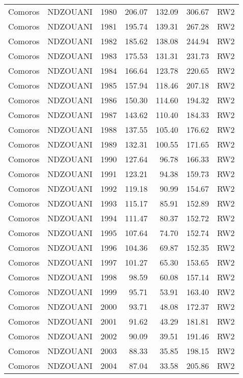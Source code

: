 \begin{longtable}{lllrrrl}
  Comoros & NDZOUANI & 1980 & 206.07 & 132.09 & 306.67 & RW2 \\ 
  Comoros & NDZOUANI & 1981 & 195.74 & 139.31 & 267.28 & RW2 \\ 
  Comoros & NDZOUANI & 1982 & 185.62 & 138.08 & 244.94 & RW2 \\ 
  Comoros & NDZOUANI & 1983 & 175.53 & 131.31 & 231.73 & RW2 \\ 
  Comoros & NDZOUANI & 1984 & 166.64 & 123.78 & 220.65 & RW2 \\ 
  Comoros & NDZOUANI & 1985 & 157.94 & 118.46 & 207.18 & RW2 \\ 
  Comoros & NDZOUANI & 1986 & 150.30 & 114.60 & 194.32 & RW2 \\ 
  Comoros & NDZOUANI & 1987 & 143.62 & 110.40 & 184.33 & RW2 \\ 
  Comoros & NDZOUANI & 1988 & 137.55 & 105.40 & 176.62 & RW2 \\ 
  Comoros & NDZOUANI & 1989 & 132.31 & 100.55 & 171.65 & RW2 \\ 
  Comoros & NDZOUANI & 1990 & 127.64 & 96.78 & 166.33 & RW2 \\ 
  Comoros & NDZOUANI & 1991 & 123.21 & 94.38 & 159.73 & RW2 \\ 
  Comoros & NDZOUANI & 1992 & 119.18 & 90.99 & 154.67 & RW2 \\ 
  Comoros & NDZOUANI & 1993 & 115.17 & 85.91 & 152.89 & RW2 \\ 
  Comoros & NDZOUANI & 1994 & 111.47 & 80.37 & 152.72 & RW2 \\ 
  Comoros & NDZOUANI & 1995 & 107.64 & 74.70 & 152.74 & RW2 \\ 
  Comoros & NDZOUANI & 1996 & 104.36 & 69.87 & 152.35 & RW2 \\ 
  Comoros & NDZOUANI & 1997 & 101.27 & 65.30 & 153.65 & RW2 \\ 
  Comoros & NDZOUANI & 1998 & 98.59 & 60.08 & 157.14 & RW2 \\ 
  Comoros & NDZOUANI & 1999 & 95.71 & 53.91 & 163.40 & RW2 \\ 
  Comoros & NDZOUANI & 2000 & 93.71 & 48.08 & 172.37 & RW2 \\ 
  Comoros & NDZOUANI & 2001 & 91.62 & 43.29 & 181.81 & RW2 \\ 
  Comoros & NDZOUANI & 2002 & 90.09 & 39.51 & 191.46 & RW2 \\ 
  Comoros & NDZOUANI & 2003 & 88.33 & 35.85 & 198.15 & RW2 \\ 
  Comoros & NDZOUANI & 2004 & 87.04 & 33.58 & 205.86 & RW2 \\ 

\end{longtable}
